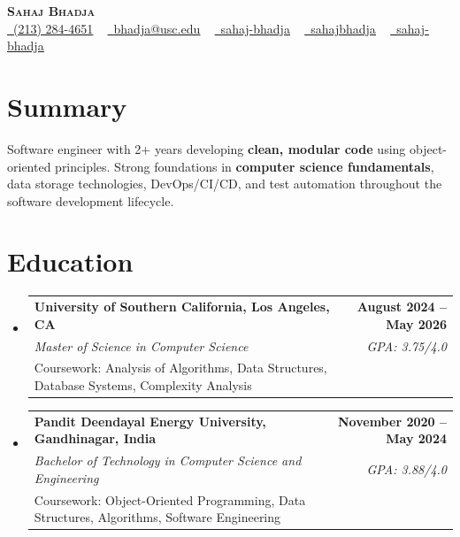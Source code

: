 \documentclass[letterpaper,10pt]{article}
\makeatletter
\newcommand{\resumeEduSubheading}[5]{\vspace{-1pt}\item\begin{tabular*}{1.0\textwidth}[t]{l@{\extracolsep{\fill}}r}\textbf{#1} & \textbf{\small #2} \\\textit{\small #3} & \textit{\small #4} \\\small #5 & \\\end{tabular*}\vspace{-4pt}}
\newcommand{\resumeSubHeadingListStart}{\begin{itemize}[leftmargin=0.0in, label={}]}
\newcommand{\resumeSubHeadingListEnd}{\end{itemize}}
\makeatother
\begin{document}
\begin{center}
{\Huge \scshape \textbf{Sahaj Bhadja}} \\ \vspace{1pt}
\small \href{tel:(213) 284-4651}{\faPhone\ \underline{(213) 284-4651}} ~ \href{mailto:bhadja@usc.edu}{\raisebox{-0.2\height}\faEnvelope\ \underline{bhadja@usc.edu}} ~
\href{https://www.linkedin.com/in/sahaj-bhadja/}{\raisebox{-0.2\height}\faLinkedin\ \underline{sahaj-bhadja}} ~ \href{https://github.com/SAHAJ-BHADJA}{\raisebox{-0.2\height}\faGithub\ \underline{sahajbhadja}} ~
\href{https://sahaj-bhadja.vercel.app/}{\raisebox{-0.2\height}\faGlobe\ \underline{sahaj-bhadja}}
\end{center}
\vspace{-18pt}
\section{Summary}
\begin{itemize}[leftmargin=0.15in, label={}]
\small{\item{Software engineer with 2+ years developing \textbf{clean, modular code} using object-oriented principles. Strong foundations in \textbf{computer science fundamentals}, data storage technologies, DevOps/CI/CD, and test automation throughout the software development lifecycle.}}
\end{itemize}
\vspace{-16pt}
\section{Education}
\resumeSubHeadingListStart
\resumeEduSubheading{University of Southern California, Los Angeles, CA}{August 2024 -- May 2026}{Master of Science in Computer Science}{GPA: 3.75/4.0}{Coursework: Analysis of Algorithms, Data Structures, Database Systems, Complexity Analysis}
\vspace{-9pt}
\resumeEduSubheading{Pandit Deendayal Energy University, Gandhinagar, India}{November 2020 -- May 2024}{Bachelor of Technology in Computer Science and Engineering}{GPA: 3.88/4.0}{Coursework: Object-Oriented Programming, Data Structures, Algorithms, Software Engineering}
\resumeSubHeadingListEnd
\vspace{-14pt}
\end{document}
